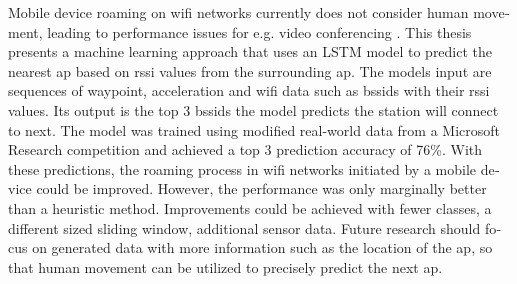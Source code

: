 \null\vfil
\begin{otherlanguage}{english}
\begin{center}\textsf{\textbf{\abstractname}}\end{center}

\noindent 
Mobile device roaming on \ac{wifi} networks currently does not consider human movement, leading to performance issues for e.g. video conferencing \cite{handoff_performance_issues}.
This thesis presents a machine learning approach that uses an LSTM model to predict the nearest \ac{ap} based on \ac{rssi} values from the surrounding \ac{ap}.
The models input are sequences of waypoint, acceleration and \ac{wifi} data such as \acp{bssid} with their \ac{rssi} values.
Its output is the top 3 \acp{bssid} the model predicts the station will connect to next.
The model was trained using modified real-world data from a Microsoft Research competition and achieved a top 3 prediction accuracy of 76\%.
With these predictions, the roaming process in \ac{wifi} networks initiated by a mobile device could be improved.
However, the performance was only marginally better than a heuristic method.
Improvements could be achieved with fewer classes, a different sized sliding window, additional sensor data.
Future research should focus on generated data with more information such as the location of the \ac{ap}, so that human movement can be utilized to precisely predict the next \ac{ap}.
\end{otherlanguage}
\vfil\null




